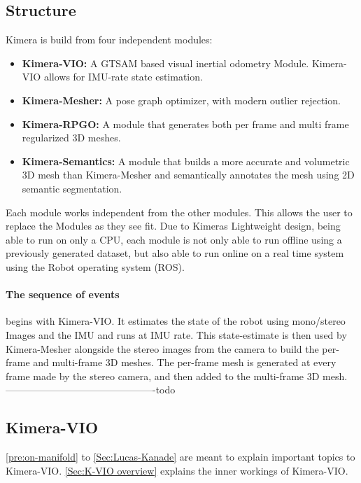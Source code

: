 \documentclass[11pt,a4paper]{article}
\begin{document}
\subsection{Structure}
Kimera is build from four independent modules: 
\begin{itemize}
    \item \textbf{Kimera-VIO:} A GTSAM \cite{gtsam} based visual inertial odometry Module. Kimera-VIO allows for IMU-rate state estimation. 
    \item \textbf{Kimera-Mesher:} A pose graph optimizer, with modern outlier rejection.
    \item \textbf{Kimera-RPGO:} A module that generates both per frame and multi frame regularized 3D meshes. 
    \item \textbf{Kimera-Semantics:} A module that builds a more accurate and volumetric 3D mesh than Kimera-Mesher and semantically annotates the mesh using 2D semantic segmentation. 
\end{itemize}
Each module works independent from the other modules. This allows the user to replace the Modules as they see fit. 
Due to Kimeras Lightweight design, being able to run on only a CPU, each module is not only able to run  offline using a previously generated dataset, but also able to run online on a real time system using the Robot operating system (ROS).
\paragraph{The sequence of events} begins with Kimera-VIO. 
It estimates the state of the robot using mono/stereo Images and the IMU and runs at IMU rate. 
This state-estimate is then used by Kimera-Mesher alongside the stereo images from the camera to build the per-frame and multi-frame 3D meshes.
The per-frame mesh is generated at every frame made by the stereo camera, and then added to the multi-frame 3D mesh.
----------------------------------------------todo


\subsection{Kimera-VIO}
\ref{pre:on-manifold} to \ref{Sec:Lucas-Kanade} are meant to explain important topics to Kimera-VIO.
\ref{Sec:K-VIO overview} explains the inner workings of Kimera-VIO.
\end{document}
